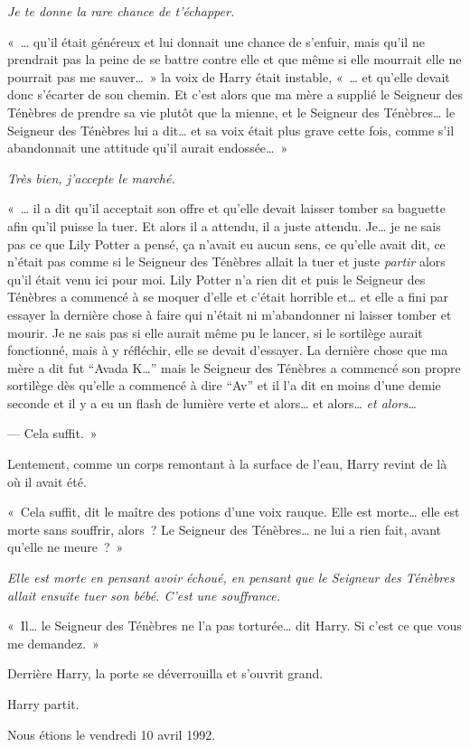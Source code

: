 \emph{Je te donne la rare chance de t'échapper.}

«~… qu'il était généreux et lui donnait une chance de s'enfuir, mais qu'il ne prendrait pas la peine de se battre contre elle et que même si elle mourrait elle ne pourrait pas me sauver…~» la voix de Harry était instable, «~… et qu'elle devait donc s'écarter de son chemin. Et c'est alors que ma mère a supplié le Seigneur des Ténèbres de prendre sa vie plutôt que la mienne, et le Seigneur des Ténèbres… le Seigneur des Ténèbres lui a dit… et sa voix était plus grave cette fois, comme s'il abandonnait une attitude qu'il aurait endossée…~»

\emph{Très bien, j'accepte le marché.}

«~… il a dit qu'il acceptait son offre et qu'elle devait laisser tomber sa baguette afin qu'il puisse la tuer. Et alors il a attendu, il a juste attendu. Je… je ne sais pas ce que Lily Potter a pensé, ça n'avait eu aucun sens, ce qu'elle avait dit, ce n'était pas comme si le Seigneur des Ténèbres allait la tuer et juste \emph{partir} alors qu'il était venu ici pour moi. Lily Potter n'a rien dit et puis le Seigneur des Ténèbres a commencé à se moquer d'elle et c'était horrible et… et elle a fini par essayer la dernière chose à faire qui n'était ni m'abandonner ni laisser tomber et mourir. Je ne sais pas si elle aurait même pu le lancer, si le sortilège aurait fonctionné, mais à y réfléchir, elle se devait d'essayer. La dernière chose que ma mère a dit fut “Avada K…” mais le Seigneur des Ténèbres a commencé son propre sortilège dès qu'elle a commencé à dire “Av” et il l'a dit en moins d'une demie seconde et il y a eu un flash de lumière verte et alors… et alors… \emph{et alors…}

--- Cela suffit.~»

Lentement, comme un corps remontant à la surface de l'eau, Harry revint de là où il avait été.

«~Cela suffit, dit le maître des potions d'une voix rauque. Elle est morte… elle est morte sans souffrir, alors~? Le Seigneur des Ténèbres… ne lui a rien fait, avant qu'elle ne meure~?~»

\emph{Elle est morte en pensant avoir échoué, en pensant que le Seigneur des Ténèbres allait ensuite tuer son bébé. C'est une souffrance.}

«~Il… le Seigneur des Ténèbres ne l'a pas torturée… dit Harry. Si c'est ce que vous me demandez.~»

Derrière Harry, la porte se déverrouilla et s'ouvrit grand.

Harry partit.

Nous étions le vendredi 10 avril 1992.
